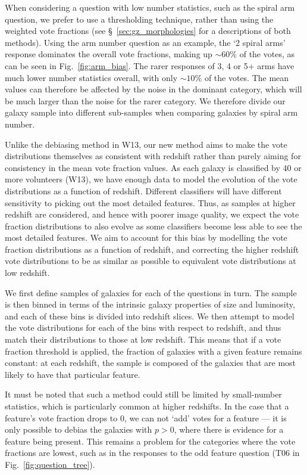\documentclass[useAMS,usenatbib]{mn2e}
\begin{document}
When considering a question with low number statistics, such as the spiral arm question, we prefer to use a thresholding technique, rather than using the weighted vote fractions (see \S~\ref{sec:gz_morphologies} for a descriptions of both methods). Using the arm number question as an example, the `2 spiral arms' response dominates the overall vote fractions, making up $\sim 60 \%$ of the votes, as can be seen in Fig.~\ref{fig:arm_bias}. The rarer responses of 3, 4 or 5+ arms have much lower number statistics overall, with only $\sim 10 \%$ of the votes. The mean values can therefore be affected by the noise in the dominant category, which will be much larger than the noise for the rarer category. We therefore divide our galaxy sample into different sub-samples when comparing galaxies by spiral arm number.

Unlike the debiasing method in W13, our new method aims to make the vote distributions themselves as consistent with redshift rather than purely aiming for consistency in the mean vote fraction values. As each galaxy is classified by 40 or more volunteers (W13), we have enough data to model the evolution of the vote distributions as a function of redshift. Different classifiers will have different sensitivity to picking out the most detailed features. Thus, as samples at higher redshift are considered, and hence with poorer image quality, we expect the vote fraction distributions to also evolve as some classifiers become less able to see the most detailed features. We aim to account for this bias by modelling the vote fraction distributions as a function of redshift, and correcting the higher redshift vote distributions to be as similar as possible to equivalent vote distributions at low redshift. 

We first define samples of galaxies for each of the questions in turn. The sample is then binned in terms of the intrinsic galaxy properties of size and luminosity, and each of these bins is divided into redshift slices. We then attempt to model the vote distributions for each of the bins with respect to redshift, and thus match their distributions to those at low redshift. This means that if a vote fraction threshold is applied, the fraction of galaxies with a given feature remains constant: at each redshift, the sample is composed of the galaxies that are most likely to have that particular feature. 

It must be noted that such a method could still be limited by small-number statistics, which is particularly common at higher redshifts. In the case that a feature's vote fraction drops to 0, we can not `add' votes for a feature --- it is only possible to debias the galaxies with $p>0$, where there is evidence for a feature being present. This remains a problem for the categories where the vote fractions are lowest, such as in the responses to the odd feature question (T06 in Fig.~\ref{fig:question_tree}).
\end{document}
